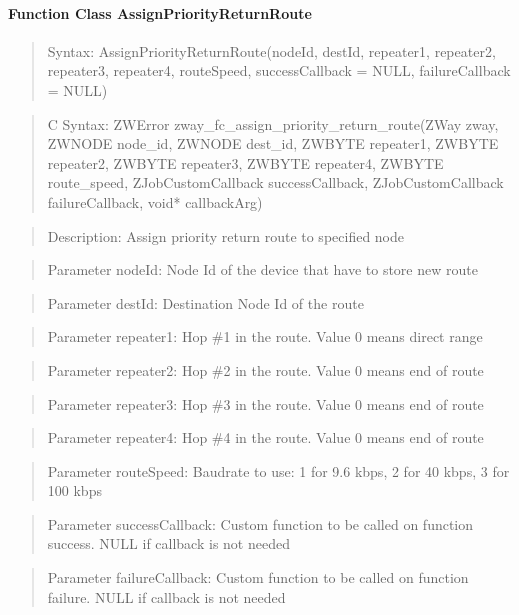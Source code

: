\paragraph{Function Class AssignPriorityReturnRoute}
\begin{quote}Syntax: AssignPriorityReturnRoute(nodeId, destId, repeater1, repeater2, repeater3, repeater4, routeSpeed, successCallback = NULL, failureCallback = NULL)\end{quote}
\begin{quote}C Syntax: ZWError zway\_fc\_assign\_priority\_return\_route(ZWay zway, ZWNODE node\_id, ZWNODE dest\_id, ZWBYTE repeater1, ZWBYTE repeater2, ZWBYTE repeater3, ZWBYTE repeater4, ZWBYTE route\_speed, ZJobCustomCallback successCallback, ZJobCustomCallback failureCallback, void* callbackArg)\end{quote}
\begin{quote}Description: Assign priority return route to specified node\end{quote}
\begin{quote}Parameter nodeId: Node Id of the device that have to store new route\end{quote}
\begin{quote}Parameter destId: Destination Node Id of the route\end{quote}
\begin{quote}Parameter repeater1: Hop \#1 in the route. Value 0 means direct range\end{quote}
\begin{quote}Parameter repeater2: Hop \#2 in the route. Value 0 means end of route\end{quote}
\begin{quote}Parameter repeater3: Hop \#3 in the route. Value 0 means end of route\end{quote}
\begin{quote}Parameter repeater4: Hop \#4 in the route. Value 0 means end of route\end{quote}
\begin{quote}Parameter routeSpeed: Baudrate to use: 1 for 9.6 kbps, 2 for 40 kbps, 3 for 100 kbps\end{quote}
\begin{quote}Parameter successCallback: Custom function to be called on function success. NULL if callback is not needed\end{quote}
\begin{quote}Parameter failureCallback: Custom function to be called on function failure. NULL if callback is not needed\end{quote}


